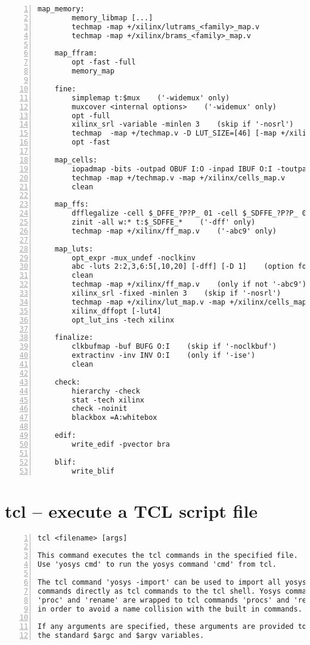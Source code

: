 \begin{lstlisting}[numbers=left,frame=single]
    map_memory:
        memory_libmap [...]
        techmap -map +/xilinx/lutrams_<family>_map.v
        techmap -map +/xilinx/brams_<family>_map.v

    map_ffram:
        opt -fast -full
        memory_map

    fine:
        simplemap t:$mux    ('-widemux' only)
        muxcover <internal options>    ('-widemux' only)
        opt -full
        xilinx_srl -variable -minlen 3    (skip if '-nosrl')
        techmap  -map +/techmap.v -D LUT_SIZE=[46] [-map +/xilinx/mux_map.v] -map +/xilinx/arith_map.v
        opt -fast

    map_cells:
        iopadmap -bits -outpad OBUF I:O -inpad IBUF O:I -toutpad OBUFT ~T:I:O -tinoutpad IOBUF ~T:O:I:IO A:top    (skip if '-noiopad')
        techmap -map +/techmap.v -map +/xilinx/cells_map.v
        clean

    map_ffs:
        dfflegalize -cell $_DFFE_?P?P_ 01 -cell $_SDFFE_?P?P_ 01 -cell $_DLATCH_?P?_ 01    (for xc6v, xc7, xcu, xcup)
        zinit -all w:* t:$_SDFFE_*    ('-dff' only)
        techmap -map +/xilinx/ff_map.v    ('-abc9' only)

    map_luts:
        opt_expr -mux_undef -noclkinv
        abc -luts 2:2,3,6:5[,10,20] [-dff] [-D 1]    (option for '-nowidelut', '-dff', '-retime')
        clean
        techmap -map +/xilinx/ff_map.v    (only if not '-abc9')
        xilinx_srl -fixed -minlen 3    (skip if '-nosrl')
        techmap -map +/xilinx/lut_map.v -map +/xilinx/cells_map.v -D LUT_WIDTH=[46]
        xilinx_dffopt [-lut4]
        opt_lut_ins -tech xilinx

    finalize:
        clkbufmap -buf BUFG O:I    (skip if '-noclkbuf')
        extractinv -inv INV O:I    (only if '-ise')
        clean

    check:
        hierarchy -check
        stat -tech xilinx
        check -noinit
        blackbox =A:whitebox

    edif:
        write_edif -pvector bra 

    blif:
        write_blif 
\end{lstlisting}

\section{tcl -- execute a TCL script file}
\label{cmd:tcl}
\begin{lstlisting}[numbers=left,frame=single]
    tcl <filename> [args]

This command executes the tcl commands in the specified file.
Use 'yosys cmd' to run the yosys command 'cmd' from tcl.

The tcl command 'yosys -import' can be used to import all yosys
commands directly as tcl commands to the tcl shell. Yosys commands
'proc' and 'rename' are wrapped to tcl commands 'procs' and 'renames'
in order to avoid a name collision with the built in commands.

If any arguments are specified, these arguments are provided to the script via
the standard $argc and $argv variables.
\end{lstlisting}

